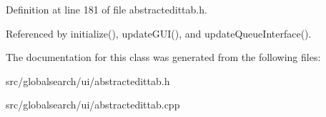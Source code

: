Definition at line 181 of file abstractedittab.\+h.



Referenced by initialize(), update\+G\+U\+I(), and update\+Queue\+Interface().



The documentation for this class was generated from the following files\+:\begin{DoxyCompactItemize}
\item 
src/globalsearch/ui/abstractedittab.\+h\item 
src/globalsearch/ui/abstractedittab.\+cpp\end{DoxyCompactItemize}
